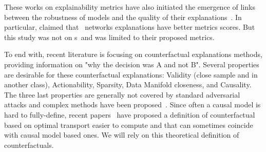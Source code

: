 These works on explainability metrics have also initiated the emergence of links between the robustness of models and the quality of their explanations~\cite{Chalasani20explanationAdvTraining,wang2022robust}. In particular,\cite{felHowGood22} claimed that \onlyonelip~networks explanations have better metrics scores. But this study was not on \otnn s~and was limited to their proposed metrics.

To end with, recent literature is focusing on  counterfactual explanations \cite{wachter2017counterfactual,Verma20CounterfactualReview} methods, providing information on "why the decision was A and not B". Several properties are desirable for these counterfactual explanations\cite{Verma20CounterfactualReview}: Validity (close sample and in another class), Actionability, Sparsity, Data Manifold closeness, and Causality.
The three last properties are generally not covered by standard adversarial attacks and complex methods have been proposed~\cite{Goyal19counter,rodriguez21beyond,wang20scout}. %
Since often a causal model is hard to fully-define, recent papers~\cite{black19OptimTransp,deLara2021} have proposed a definition of counterfactual based on optimal transport easier to compute and that can sometimes coincide with causal model based ones. 
We will rely on this theoretical definition of counterfactuals.